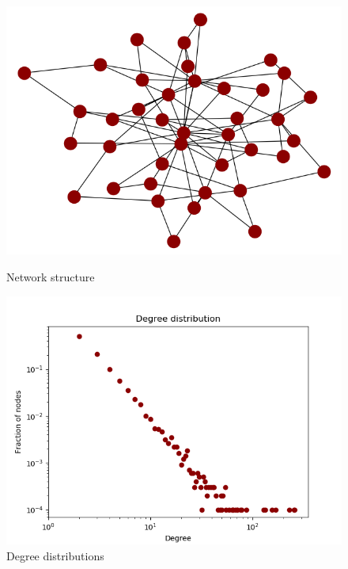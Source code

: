 \documentclass[11pt]{article}
\begin{document}
\begin{figure}
\centering
\begin{minipage}{.5\textwidth}
  \centering
  \includegraphics[width=1\linewidth]{networkplot}
  \caption{Network structure}  
  \label{fig:3}
  
\end{minipage}%
\begin{minipage}{.5\textwidth}
  \centering
  \includegraphics[width=1\linewidth]{degreedistribution}
  \caption{Degree distributions}
  \label{fig:4}
 
\end{minipage}%
\end{figure}
\end{document}
